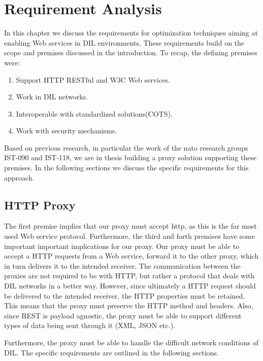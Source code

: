 \chapter{Requirement Analysis}

In this chapter we discuss the requirements for optimization techniques aiming
at enabling Web services in DIL environments. These requirements build on the
scope and premises discussed in the introduction. To recap, the defining
premises were:

\begin{enumerate}
    \item Support HTTP RESTful and W3C Web services.
    \item Work in DIL networks.
    \item Interoperable with standardized solutions(COTS).
    \item Work with security mechanisms.
\end{enumerate}

Based on previous research, in particular the work of the \gls{nato}
research groups IST-090 and IST-118, we are in thesis building a proxy solution
supporting these premises. In the following sections we discuss the specific requirements
for this approach.

\section{HTTP Proxy}

The first premise implies that our proxy must accept \gls{http}, as this is the far
most used Web service protocol. Furthermore, the third and forth premises have
some important important implications for our proxy. Our proxy must be able to
accept a HTTP requests from a Web service, forward it to the other proxy, which
in turn delivers it to the intended receiver. The communication between the
proxies are not required to be with HTTP, but rather a protocol that deals with DIL
networks in a better way. However, since ultimately a HTTP request should be
delivered to the intended receiver, the HTTP properties must be retained. This
means that the proxy must preserve the HTTP method and headers. Also, since
REST is payload agnostic, the proxy must be able to support different types of
data being sent through it (XML, JSON etc.).

Furthermore, the proxy must be able to handle the difficult network conditions
of DIL. The specific requirements are outlined in the following sections.

